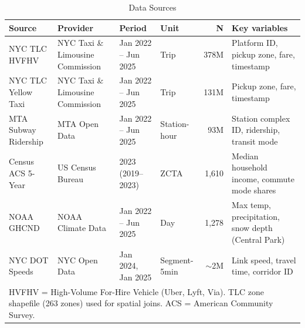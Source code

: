 \begin{table}[htbp]
\centering
\caption{Data Sources}
\label{tab:data}
\small
\begin{tabular}{llllrl}
\toprule
\textbf{Source} & \textbf{Provider} & \textbf{Period} & \textbf{Unit} & \textbf{N} & \textbf{Key variables} \\
\midrule
NYC TLC HVFHV & NYC Taxi \& Limousine Commission & Jan 2022 -- Jun 2025 & Trip & 378M & Platform ID, pickup zone, fare, timestamp \\
NYC TLC Yellow Taxi & NYC Taxi \& Limousine Commission & Jan 2022 -- Jun 2025 & Trip & 131M & Pickup zone, fare, timestamp \\
MTA Subway Ridership & MTA Open Data & Jan 2022 -- Jun 2025 & Station-hour & 93M & Station complex ID, ridership, transit mode \\
Census ACS 5-Year & US Census Bureau & 2023 (2019--2023) & ZCTA & 1,610 & Median household income, commute mode shares \\
NOAA GHCND & NOAA Climate Data & Jan 2022 -- Jun 2025 & Day & 1,278 & Max temp, precipitation, snow depth (Central Park) \\
NYC DOT Speeds & NYC Open Data & Jan 2024, Jan 2025 & Segment-5min & $\sim$2M & Link speed, travel time, corridor ID \\

\bottomrule
\multicolumn{999}{l}{\footnotesize HVFHV = High-Volume For-Hire Vehicle (Uber, Lyft, Via). TLC zone shapefile (263 zones) used for spatial joins. ACS = American Community Survey.}\\
\end{tabular}
\end{table}
